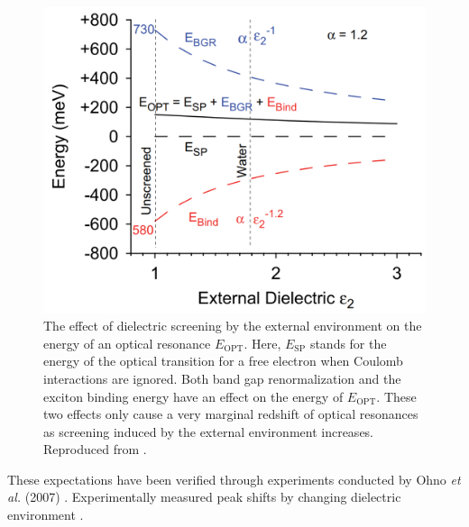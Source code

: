 \begin{figure}[ht]
	\centering
	\includegraphics[scale=0.25]{images/chapter_optical_props/dielectric_binding_walsh_2007}
	\caption{ The effect of dielectric screening by the external environment on the energy of an optical resonance $E_\text{OPT}$. Here, $E_\text{SP}$ stands for the energy of the optical transition for a free electron when Coulomb interactions are ignored. Both band gap renormalization and the exciton binding energy have an effect on the energy of $E_\text{OPT}$. These two effects only cause a very marginal redshift of optical resonances as screening induced by the external environment increases. Reproduced from \cite{walsh2008scaling}.}
	\label{fig:energy_shift_walsh}
\end{figure}

These expectations have been verified through experiments conducted by Ohno \textit{et al.} (2007) \cite{ohno2007excitonic}. Experimentally measured peak shifts by changing dielectric environment \cite{ohno2007excitonic}.

